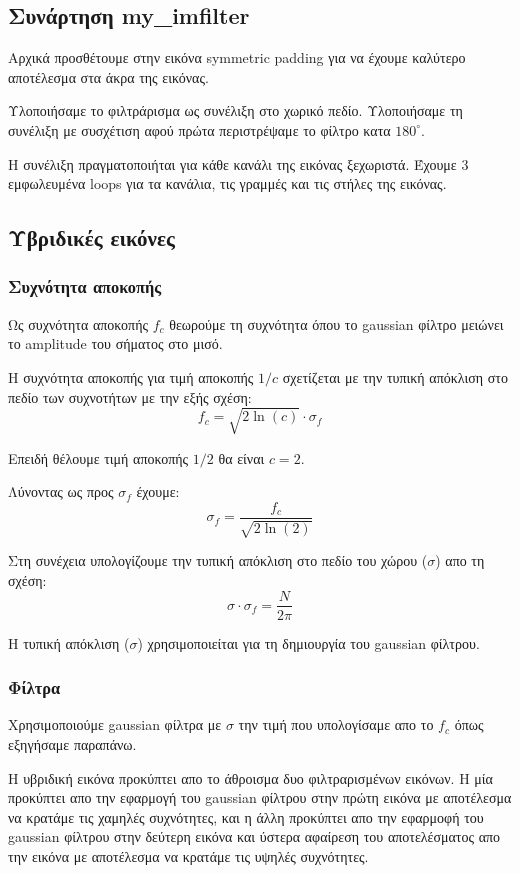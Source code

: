 \documentclass[11pt]{scrartcl} %
\begin{document}
\subsection{Συνάρτηση my\_imfilter}

Αρχικά προσθέτουμε στην εικόνα symmetric padding για να έχουμε καλύτερο αποτέλεσμα στα άκρα της εικόνας.

Υλοποιήσαμε το φιλτράρισμα ως συνέλιξη στο χωρικό πεδίο. Υλοποιήσαμε τη συνέλιξη με συσχέτιση αφού πρώτα περιστρέψαμε το φίλτρο κατα $180^{\circ}$.

Η συνέλιξη πραγματοποιήται για κάθε κανάλι της εικόνας ξεχωριστά. Έχουμε 3 εμφωλευμένα loops για τα κανάλια, τις γραμμές και τις στήλες της εικόνας.


\subsection{Υβριδικές εικόνες}

\subsubsection{Συχνότητα αποκοπής}

Ως συχνότητα αποκοπής $f_c$ θεωρούμε τη συχνότητα όπου το gaussian φίλτρο μειώνει το amplitude του σήματος στο μισό.

Η συχνότητα αποκοπής για τιμή αποκοπής $1/c$ σχετίζεται με την τυπική απόκλιση στο πεδίο των συχνοτήτων με την εξής σχέση:
\[f_c = \sqrt{2\ln(c)}\cdot\sigma_f\]

Επειδή θέλουμε τιμή αποκοπής $1/2$ θα είναι $c = 2$.

Λύνοντας ως προς $\sigma_f$ έχουμε:
\[\sigma_f = \frac{f_c}{\sqrt{2\ln(2)}}\]

Στη συνέχεια υπολογίζουμε την τυπική απόκλιση στο πεδίο του χώρου ($\sigma$) απο τη σχέση:
\[\sigma\cdot\sigma_f=\frac{N}{2\pi}\]

Η τυπική απόκλιση ($\sigma$) χρησιμοποιείται για τη δημιουργία του gaussian φίλτρου.

\subsubsection{Φίλτρα}

Χρησιμοποιούμε gaussian φίλτρα με $\sigma$ την τιμή που υπολογίσαμε απο το $f_c$ όπως εξηγήσαμε παραπάνω.

Η υβριδική εικόνα προκύπτει απο το άθροισμα δυο φιλτραρισμένων εικόνων. Η μία προκύπτει απο την εφαρμογή του gaussian φίλτρου στην πρώτη εικόνα με αποτέλεσμα να κρατάμε τις χαμηλές συχνότητες, και η άλλη προκύπτει απο την εφαρμοφή του gaussian φίλτρου στην δεύτερη εικόνα και ύστερα αφαίρεση του αποτελέσματος απο την εικόνα με αποτέλεσμα να κρατάμε τις υψηλές συχνότητες.
\end{document}
